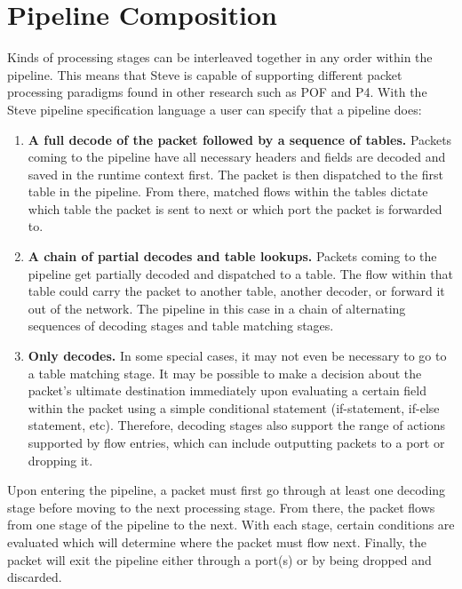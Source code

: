 \section{Pipeline Composition} \label{pipeline_comp_desc}

Kinds of processing stages can be interleaved together in any order within the pipeline. This means that Steve is capable of supporting different packet processing paradigms found in other research such as POF and P4. With the Steve pipeline specification language a user can specify that a pipeline does:

\begin{enumerate}
\item \textbf{A full decode of the packet followed by a sequence of tables.} Packets coming to the pipeline have all necessary headers and fields are decoded and saved in the runtime context first. The packet is then dispatched to the first table in the pipeline. From there, matched flows within the tables dictate which table the packet is sent to next or which port the packet is forwarded to.
\item \textbf{A chain of partial decodes and table lookups.} Packets coming to the pipeline get partially decoded and dispatched to a table. The flow within that table could carry the packet to another table, another decoder, or forward it out of the network. The pipeline in this case in a chain of alternating sequences of decoding stages and table matching stages.
\item \textbf{Only decodes.} In some special cases, it may not even be necessary to go to a table matching stage. It may be possible to make a decision about the packet’s ultimate destination immediately upon evaluating a certain field within the packet using a simple conditional statement (if-statement, if-else statement, etc). Therefore, decoding stages also support the range of actions supported by flow entries, which can include outputting packets to a port or dropping it.
\end{enumerate}

Upon entering the pipeline, a packet must first go through at least one decoding stage before moving to the next processing stage. From there, the packet flows from one stage of the pipeline to the next. With each stage, certain conditions are evaluated which will determine where the packet must flow next. Finally, the packet will exit the pipeline either through a port(s) or by being dropped and discarded.
